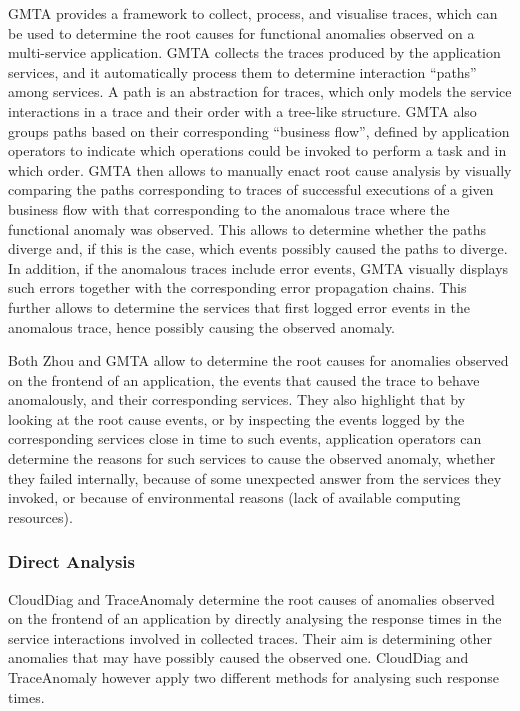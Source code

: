 GMTA \cite{45_Guo2020_GMTA} provides a framework to collect, process, and visualise traces, which can be used to determine the root causes for functional anomalies observed on a multi-service application.
GMTA \cite{45_Guo2020_GMTA} collects the traces produced by the application services, and it automatically process them to determine interaction \enquote{paths} among services.
A path is an abstraction for traces, which only models the service interactions in a trace and their order with a tree-like structure.
GMTA \cite{45_Guo2020_GMTA} also groups paths based on their corresponding \enquote{business flow}, defined by application operators to indicate which operations could be invoked to perform a task and in which order.
GMTA \cite{45_Guo2020_GMTA} then allows to manually enact root cause analysis by visually comparing the paths corresponding to traces of successful executions of a given business flow with that corresponding to the anomalous trace where the functional anomaly was observed. 
This allows to determine whether the paths diverge and, if this is the case, which events possibly caused the paths to diverge.
In addition, if the anomalous traces include error events, GMTA \cite{45_Guo2020_GMTA} visually displays such errors together with the corresponding error propagation chains. 
This further allows to determine the services that first logged error events in the anomalous trace, hence possibly causing the observed anomaly. 

Both Zhou \etal \cite{01_Zhou2021_FaultAnalysisDebuggingMicroservices} and GMTA \cite{45_Guo2020_GMTA} allow to determine the root causes for anomalies observed on the frontend of an application, \viz the events that caused the trace to behave anomalously, and their corresponding services. 
They also highlight that by looking at the root cause events, or by inspecting the events logged by the corresponding services close in time to such events, application operators can determine the reasons for such services to cause the observed anomaly, \viz whether they failed internally, because of some unexpected answer from the services they invoked, or because of environmental reasons (\eg lack of available computing resources).

\subsubsection{{Direct Analysis}}
CloudDiag \cite{41_Mi2013_PerformanceDiagnosisCloud} and TraceAnomaly \cite{16_Liu2020_TraceAnomaly} determine the root causes of anomalies observed on the frontend of an application
{%
by directly analysing the response times in the service interactions involved in collected traces.
Their aim is determining other anomalies that may have possibly caused the observed one. 
CloudDiag \cite{41_Mi2013_PerformanceDiagnosisCloud} and TraceAnomaly \cite{16_Liu2020_TraceAnomaly}  however apply two different methods for analysing such response times.
}


